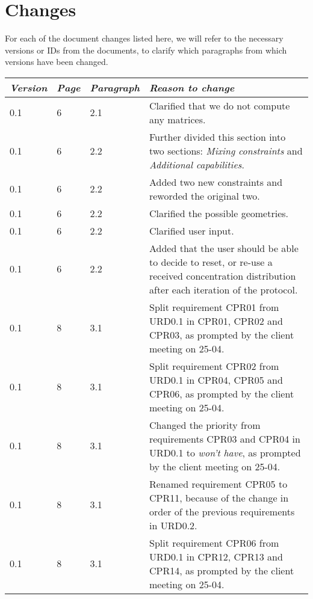 \section*{Changes}
For each of the document changes listed here, we will refer to the necessary versions or IDs from the documents, to clarify which paragraphs from which versions have been changed. \\


\begin{tabular}{|l|l|l|p{11cm}|}
    \hline
    \emph{Version} & \emph{Page} &   \emph{Paragraph}    &   \emph{Reason to change}\\
    \hline
     0.1 & 6 & 2.1 & Clarified that we do not compute any matrices. \\
     0.1 & 6 & 2.2 & Further divided this section into two sections: \emph{Mixing constraints} and \emph{Additional capabilities}. \\
     0.1 & 6 & 2.2 & Added two new constraints and reworded the original two. \\
     0.1 & 6 & 2.2 & Clarified the possible geometries. \\
     0.1 & 6 & 2.2 & Clarified user input. \\
     0.1 & 6 & 2.2 & Added that the user should be able to decide to reset, or re-use a received concentration distribution after each iteration of the protocol. \\
     0.1 & 8 & 3.1 & Split requirement CPR01 from URD0.1 in CPR01, CPR02 and CPR03, as prompted by the client meeting on 25-04. \\
     0.1 & 8 & 3.1 & Split requirement CPR02 from URD0.1 in CPR04, CPR05 and CPR06, as prompted by the client meeting on 25-04. \\
     0.1 & 8 & 3.1 & Changed the priority from requirements CPR03 and CPR04 in URD0.1 to \emph{won't have}, as prompted by the client meeting on 25-04. \\
     0.1 & 8 & 3.1 & Renamed requirement CPR05 to CPR11, because of the change in order of the previous requirements in URD0.2. \\
     0.1 & 8 & 3.1 & Split requirement CPR06 from URD0.1 in CPR12, CPR13 and CPR14, as prompted by the client meeting on 25-04. \\
   \hline
 \end{tabular}

